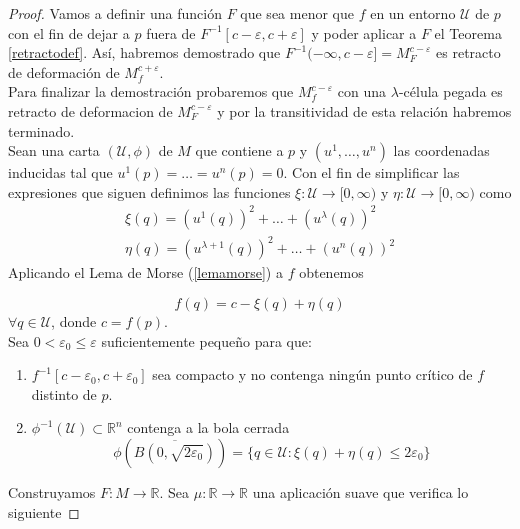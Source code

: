 \begin{proof}
    Vamos a definir una función $F$ que sea menor que $f$ en un entorno $\mathcal{U}$ de $p$ con el fin de dejar a $p$ fuera de $F^{-1}[c-\varepsilon, c+\varepsilon]$ y poder aplicar a $F$ el Teorema \ref{retractodef}. Así, habremos demostrado que $F^{-1}(-\infty,c-\varepsilon]=M^{c-\varepsilon}_F$ es retracto de deformación de $M^{c+\varepsilon}_f$.\\
    
    Para finalizar la demostración probaremos que $M^{c-\varepsilon}_f$ con una $\lambda$-célula pegada es retracto de deformacion de $M^{c-\varepsilon}_F$ y por la transitividad de esta relación habremos terminado.\\

    Sean una carta $(\mathcal{U}, \phi)$ de $M$ que contiene a $p$ y $(u^1,\dots , u^n)$ las coordenadas inducidas tal que $u^1(p)=\dots=u^{n}(p)=0$. Con el fin de simplificar las expresiones que siguen definimos las funciones $\xi:\mathcal{U}\to [0,\infty)$ y $\eta:\mathcal{U}\to [0,\infty)$ como
    \begin{gather*}
        \xi(q)=(u^1(q))^2+\dots +(u^{\lambda}(q))^2\\
        \eta(q)=(u^{\lambda +1}(q))^2+\dots +(u^{n}(q))^2
    \end{gather*}
    Aplicando el Lema de Morse (\ref{lemamorse}) a $f$ obtenemos

    \begin{equation*}
        f(q) = c - \xi(q) + \eta(q)
    \end{equation*}
    $\forall q\in \mathcal{U}$, donde $c=f(p).$\\

    Sea $0<\varepsilon_0\le\varepsilon$ suficientemente pequeño para que:
    \begin{enumerate}[label=\roman*)]
        \item $f^{-1}[c-\varepsilon_0,c+\varepsilon_0]$ sea compacto y no contenga ningún punto crítico de $f$ distinto de $p$.
        \item $\phi^{-1}(\mathcal{U})\subset \mathbb{R}^n$ contenga a la bola cerrada
        \begin{equation*}
            \phi\left(\overline{B(0, \sqrt{2\varepsilon_0})}\right)= \{q\in \mathcal{U}: \xi(q)+\eta(q)\le 2\varepsilon_0\}
        \end{equation*}
    \end{enumerate}

    Construyamos $F:M\to \mathbb{R}$. Sea $\mu:\mathbb{R}\to\mathbb{R}$ una aplicación suave que verifica lo siguiente
    

\end{proof}
